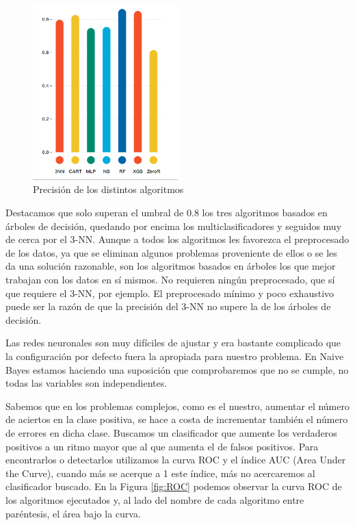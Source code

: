 \documentclass[a4paper, 20pt]{article}
\begin{document}
\begin{figure}[H]
    \centering
    \includegraphics[width=0.5\textwidth]{Accuracy}
    \caption{Precisión de los distintos algoritmos}
    \label{fig:accuracy}
\end{figure}

Destacamos que solo superan el umbral de 0.8 los tres algoritmos basados en árboles de decisión, quedando por encima los multiclasificadores y seguidos muy de cerca por el 3-NN. Aunque a todos los algoritmos les favorezca el preprocesado de los datos, ya que se eliminan algunos problemas proveniente de ellos o se les da una solución razonable, son los algoritmos basados en árboles los que mejor trabajan con los datos en sí mismos. No requieren ningún preprocesado, que sí que requiere el 3-NN, por ejemplo. El preprocesado mínimo y poco exhaustivo puede ser la razón de que la precisión del 3-NN no supere la de los árboles de decisión.

Las redes neuronales son muy difíciles de ajustar y era bastante complicado que la configuración por defecto fuera la apropiada para nuestro problema. En Naive Bayes estamos haciendo una suposición que comprobaremos que no se cumple, no todas las variables son independientes.

Sabemos que en los problemas complejos, como es el nuestro, aumentar el número de aciertos en la clase positiva, se hace a costa de incrementar también el número de errores en dicha clase. Buscamos un clasificador que aumente los verdaderos positivos a un ritmo mayor que al que aumenta el de falsos positivos. Para encontrarlos o detectarlos utilizamos la curva ROC y el índice AUC (Area Under the Curve), cuando más se acerque a 1 este índice, más no acercaremos al clasificador buscado. En la Figura \ref{fig:ROC} podemos observar la curva ROC de los algoritmos ejecutados y, al lado del nombre de cada algoritmo entre paréntesis, el área bajo la curva.
\end{document}

